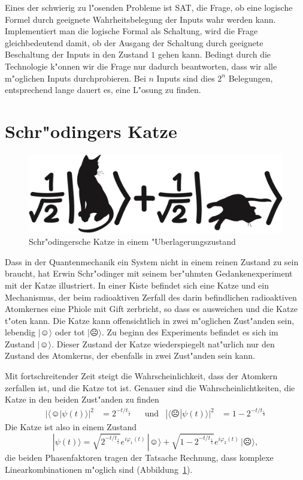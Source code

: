 Eines der schwierig zu l"osenden Probleme ist SAT, die Frage, ob eine
logische Formel durch geeignete Wahrheitsbelegung der Inputs wahr
werden kann. Implementiert man die logische Formal als Schaltung,
wird die Frage gleichbedeutend damit, ob der Ausgang der Schaltung
durch geeignete Beschaltung der Inputs in den Zustand $1$  gehen kann.
Bedingt durch die Technologie k"onnen wir die Frage nur dadurch beantworten,
dass wir alle m"oglichen Inputs durchprobieren. Bei $n$ Inputs sind
dies $2^n$ Belegungen, entsprechend lange dauert es, eine L"osung
zu finden.

\section{Schr"odingers Katze\label{section:cat}}
\begin{figure}
\centering
\includegraphics[width=0.5\hsize]{images/catliveanddead2.png}
\caption{Schr"odingersche Katze in einem "Uberlagerungszustand
\label{skript:deadandalive}}
\end{figure}
Dass in der Quantenmechanik ein System nicht in einem reinen Zustand
zu sein braucht, hat Erwin Schr"odinger mit seinem ber"uhmten 
Gedankenexperiment mit der Katze illustriert.
In einer Kiste befindet sich eine Katze und ein Mechanismus,
der beim radioaktiven Zerfall des darin befindlichen radioaktiven
Atomkernes eine Phiole mit Gift zerbricht, so dass es ausweichen und
die Katze t"oten kann.
Die Katze kann offensichtlich in zwei m"oglichen Zust"anden sein,
lebendig $|\smiley\rangle$ oder tot $|\frownie\rangle$. 
Zu beginn des Experiments befindet es sich im Zustand $|\smiley\rangle$.
Dieser Zustand der Katze wiederspiegelt nat"urlich nur den Zustand
des Atomkerns, der ebenfalls in zwei Zust"anden sein kann.

Mit fortschreitender Zeit steigt die Wahrscheinlichkeit, dass der
Atomkern zerfallen ist, und die Katze tot ist.
Genauer sind die Wahrscheinlichtkeiten, die Katze in den beiden
Zust"anden zu finden
\begin{align*}
|\langle \smiley|\psi(t)\rangle|^2
&=
2^{-t/t_{\frac12}}
&&\text{und}
&
|\langle \frownie|\psi(t)\rangle|^2
&=
1-2^{-t/t_{\frac12}}
\end{align*}
Die Katze ist also in einem Zustand
\[
|\psi(t)\rangle = 
\sqrt{2^{-t/t_{\frac12}}}e^{i\varphi_1(t)}\,|\smiley\rangle
+
\sqrt{1-2^{-t/t_{\frac12}}}e^{i\varphi_2(t)}\,|\frownie\rangle,
\]
die beiden Phasenfaktoren tragen der Tatsache Rechnung, dass komplexe
Linearkombinationen m"oglich sind (Abbildung~\ref{skript:deadandalive}).

